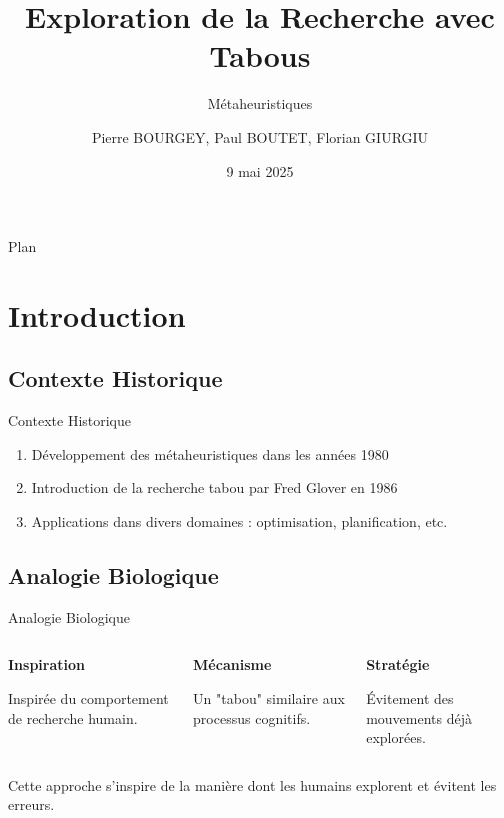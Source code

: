 \documentclass[10pt, handout]{beamer}
\title{Exploration de la Recherche avec Tabous}
\subtitle{Métaheuristiques}
\author{Pierre BOURGEY, Paul BOUTET, Florian GIURGIU}
\institute{Télécom Saint-Etienne}
\date{9 mai 2025}
\begin{document}
\begin{frame}
    \titlepage
\end{frame}

\begin{frame}{Plan}
    \tableofcontents[hideallsubsections]
\end{frame}

\section{Introduction}
\subsection{Contexte Historique}
\begin{frame}{Contexte Historique}
    \begin{enumerate}
        \item Développement des métaheuristiques dans les années 1980
        \item Introduction de la recherche tabou par Fred Glover en 1986
        \item Applications dans divers domaines : optimisation, planification, etc.
    \end{enumerate}
\end{frame}

\subsection{Analogie Biologique}
\begin{frame}{Analogie Biologique}
    \begin{columns}[T] %
        \begin{column}{0.33\textwidth}
            \textbf{Inspiration}
            \medskip

            Inspirée du comportement de recherche humain. \medskip

        \end{column}
        \begin{column}{0.33\textwidth}

            \textbf{Mécanisme}
            \medskip

            Un "tabou" similaire aux processus cognitifs. \medskip

        \end{column}
        \begin{column}{0.33\textwidth}
            \textbf{Stratégie}
            \medskip

            Évitement des mouvements déjà explorées.
            \medskip

        \end{column}
    \end{columns}
    \bigskip
    Cette approche s'inspire de la manière dont les humains explorent et évitent les erreurs.
\end{frame}
\end{document}

